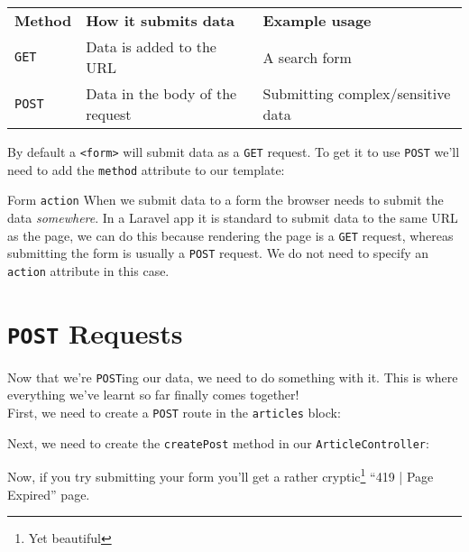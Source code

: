 \begin{tabularx}{\textwidth}{l l X}
    \textbf{Method} & \textbf{How it submits data}       & \textbf{Example usage} \\
    \texttt{GET}    & Data is added to the URL           & A search form \\
    \texttt{POST}   & Data in the body of the request    & Submitting complex/sensitive data \\
\end{tabularx}

\par\bigskip

By default a \texttt{<form>} will submit data as a \texttt{GET} request. To get it to use \texttt{POST} we'll need to add the \texttt{method} attribute to our template:



\begin{infobox}{Form \texttt{action}}
    When we submit data to a form the browser needs to submit the data \textit{somewhere}. In a Laravel app it is standard to submit data to the same URL as the page, we can do this because rendering the page is a \texttt{GET} request, whereas submitting the form is usually a \texttt{POST} request. We do not need to specify an \texttt{action} attribute in this case.
\end{infobox}


\section{\texttt{POST} Requests}

Now that we're \texttt{POST}ing our data, we need to do something with it. This is where everything we've learnt so far finally comes together!
\\

First, we need to create a \texttt{POST} route in the \texttt{articles} block:


Next, we need to create the \texttt{createPost} method in our \texttt{ArticleController}:


Now, if you try submitting your form you'll get a rather cryptic\footnote{Yet beautiful} ``419 | Page Expired'' page.
\\

